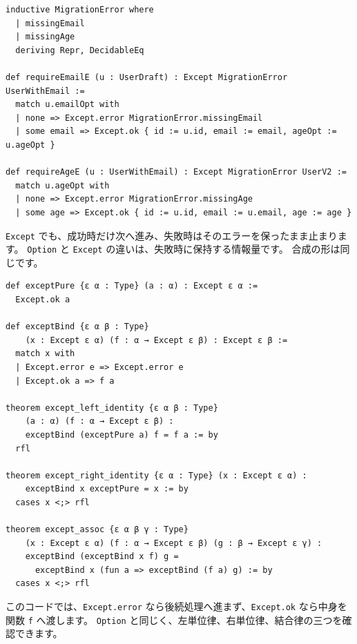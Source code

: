 \begin{listing}[htbp]
\begin{verbatim}
inductive MigrationError where
  | missingEmail
  | missingAge
  deriving Repr, DecidableEq

def requireEmailE (u : UserDraft) : Except MigrationError UserWithEmail :=
  match u.emailOpt with
  | none => Except.error MigrationError.missingEmail
  | some email => Except.ok { id := u.id, email := email, ageOpt := u.ageOpt }

def requireAgeE (u : UserWithEmail) : Except MigrationError UserV2 :=
  match u.ageOpt with
  | none => Except.error MigrationError.missingAge
  | some age => Except.ok { id := u.id, email := u.email, age := age }
\end{verbatim}
\caption{\texttt{MigrationError} と移行処理}
\label{lst:ch17_except}
\end{listing}

\texttt{Except} でも、成功時だけ次へ進み、失敗時はそのエラーを保ったまま止まります。
\texttt{Option} と \texttt{Except} の違いは、失敗時に保持する情報量です。
合成の形は同じです。

\begin{listing}[htbp]
\begin{verbatim}
def exceptPure {ε α : Type} (a : α) : Except ε α :=
  Except.ok a

def exceptBind {ε α β : Type}
    (x : Except ε α) (f : α → Except ε β) : Except ε β :=
  match x with
  | Except.error e => Except.error e
  | Except.ok a => f a

theorem except_left_identity {ε α β : Type}
    (a : α) (f : α → Except ε β) :
    exceptBind (exceptPure a) f = f a := by
  rfl

theorem except_right_identity {ε α : Type} (x : Except ε α) :
    exceptBind x exceptPure = x := by
  cases x <;> rfl

theorem except_assoc {ε α β γ : Type}
    (x : Except ε α) (f : α → Except ε β) (g : β → Except ε γ) :
    exceptBind (exceptBind x f) g =
      exceptBind x (fun a => exceptBind (f a) g) := by
  cases x <;> rfl
\end{verbatim}
\caption{\texttt{Except} の三法則}
\label{lst:ch17_except_laws}
\end{listing}

このコードでは、\texttt{Except.error} なら後続処理へ進まず、\texttt{Except.ok} なら中身を関数 \texttt{f} へ渡します。
\texttt{Option} と同じく、左単位律、右単位律、結合律の三つを確認できます。

